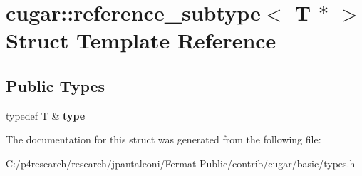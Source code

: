 \hypertarget{structcugar_1_1reference__subtype_3_01_t_01_5_01_4}{}\section{cugar\+:\+:reference\+\_\+subtype$<$ T $\ast$ $>$ Struct Template Reference}
\label{structcugar_1_1reference__subtype_3_01_t_01_5_01_4}
\subsection*{Public Types}
\begin{DoxyCompactItemize}
\item 
\mbox{\label{structcugar_1_1reference__subtype_3_01_t_01_5_01_4_a8c3f162dc97ce2cfe57f74a74d95bf79}} 
typedef T \& {\bfseries type}
\end{DoxyCompactItemize}


The documentation for this struct was generated from the following file\+:\begin{DoxyCompactItemize}
\item 
C\+:/p4research/research/jpantaleoni/\+Fermat-\/\+Public/contrib/cugar/basic/types.\+h\end{DoxyCompactItemize}
